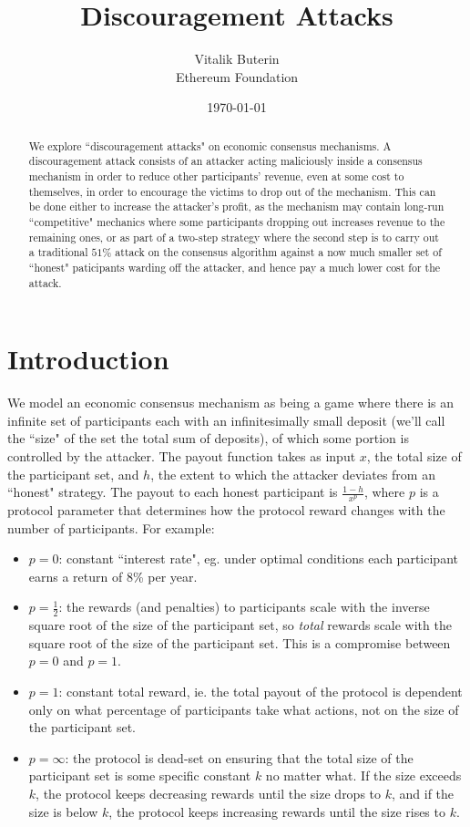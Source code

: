\documentclass[12pt]{article}
\title{Discouragement Attacks}
\author{
        Vitalik Buterin \\
        Ethereum Foundation
}
\date{\today}
\begin{document}
\maketitle
\begin{abstract}
We explore ``discouragement attacks" on economic consensus mechanisms. A discouragement attack consists of an attacker acting maliciously inside a consensus mechanism in order to reduce other participants' revenue, even at some cost to themselves, in order to encourage the victims to drop out of the mechanism. This can be done either to increase the attacker's profit, as the mechanism may contain long-run ``competitive" mechanics where some participants dropping out increases revenue to the remaining ones, or as part of a two-step strategy where the second step is to carry out a traditional $51\%$ attack on the consensus algorithm against a now much smaller set of ``honest" paticipants warding off the attacker, and hence pay a much lower cost for the attack.
\end{abstract}

\section{Introduction}
We model an economic consensus mechanism as being a game where there is an infinite set of participants each with an infinitesimally small deposit (we'll call the ``size" of the set the total sum of deposits), of which some portion is controlled by the attacker. The payout function takes as input $x$, the total size of the participant set, and $h$, the extent to which the attacker deviates from an ``honest" strategy. The payout to each honest participant is $\frac{1-h}{x^p}$, where $p$ is a protocol parameter that determines how the protocol reward changes with the number of participants. For example:

\begin{itemize}
\item $p=0$: constant ``interest rate", eg. under optimal conditions each participant earns a return of 8\% per year.
\item $p=\frac{1}{2}$: the rewards (and penalties) to participants scale with the inverse square root of the size of the participant set, so \textit{total} rewards scale with the square root of the size of the participant set. This is a compromise between $p=0$ and $p=1$. 
\item $p=1$: constant total reward, ie. the total payout of the protocol is dependent only on what percentage of participants take what actions, not on the size of the participant set. 
\item $p=\infty$: the protocol is dead-set on ensuring that the total size of the participant set is some specific constant $k$ no matter what. If the size exceeds $k$, the protocol keeps decreasing rewards until the size drops to $k$, and if the size is below $k$, the protocol keeps increasing rewards until the size rises to $k$.
\end{itemize}
\end{document}
